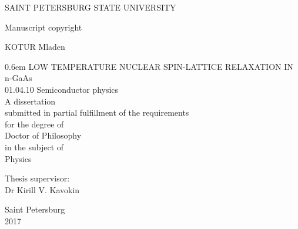 \documentclass[14pt, a4]{report}
\renewcommand{\headrulewidth}{0pt}
\renewcommand{\footrulewidth}{0pt}
\begin{document}
\newcommand\nbvspace[1][3]{\vspace*{\stretch{#1}}}
\newcommand\nbstretchyspace{\spaceskip0.5em plus 0.25em minus 0.25em}
\newcommand{\nbtitlestretch}{\spaceskip0.6em}
\thispagestyle{empty}
\clearpage
\begin{center}
\nbvspace[0]
\normalsize
\Large SAINT PETERSBURG STATE UNIVERSITY

\begin{flushright}
\nbvspace[0]
\normalsize
\Large Manuscript copyright
\end{flushright}

\nbvspace[1]
\normalsize
\Large KOTUR Mladen

\nbvspace[1]
\Huge
{\nbtitlestretch\huge
LOW TEMPERATURE NUCLEAR SPIN-LATTICE RELAXATION IN n-GaAs}\\
\normalsize
\Large 01.04.10 Semiconductor physics\\
\normalsize
\Large A dissertation\\
\large submitted in partial fulfillment of the requirements\\
for the degree of\\
Doctor of Philosophy\\
 in the subject of\\
Physics

\begin{flushright}
\nbvspace[2]
\normalsize
\Large Thesis supervisor:\\
Dr Kirill V. Kavokin
\end{flushright}

\nbvspace[3]
\normalsize
\large Saint Petersburg\\
2017
\end{center}
\clearpage
\fancypagestyle{plain}{%
\fancyhf{} %
\fancyhead{} %
\fancyfoot{} %
\fancyhead[CO]{\thepage}
\fancyhead[CE]{\thepage}
\renewcommand{\headrulewidth}{0pt}
\renewcommand{\footrulewidth}{0pt}
}

\fontsize{14}{15}\selectfont
\tableofcontents

\thispagestyle{plain}

\pagestyle{fancy}
\fancyhf{} %
\fancyhead{} %
\fancyfoot{} %
\fancyhead[CO]{\thepage}
\fancyhead[CE]{\thepage}
\renewcommand{\headrulewidth}{0pt}
\renewcommand{\footrulewidth}{0pt}

\cleardoublepage
{}
{}

\thispagestyle{plain}

\cleardoublepage
{}
{}%
\listoffigures\thispagestyle{plain}
\end{document}
